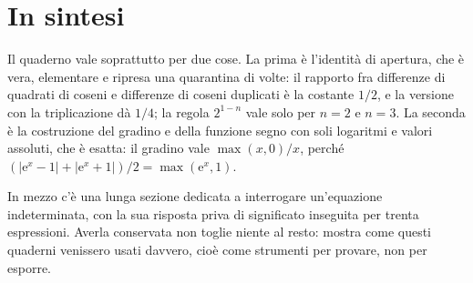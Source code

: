 \section*{In sintesi}

Il quaderno vale soprattutto per due cose. La prima è l'identità di apertura, che è vera, elementare e ripresa una quarantina di volte: il rapporto fra differenze di quadrati di coseni e differenze di coseni duplicati è la costante $1/2$, e la versione con la triplicazione dà $1/4$; la regola $2^{1-n}$ vale solo per $n=2$ e $n=3$. La seconda è la costruzione del gradino e della funzione segno con soli logaritmi e valori assoluti, che è esatta: il gradino vale $\max(x,0)/x$, perché $\left(|\mathrm{e}^x-1|+|\mathrm{e}^x+1|\right)/2=\max(\mathrm{e}^x,1)$.

In mezzo c'è una lunga sezione dedicata a interrogare un'equazione indeterminata, con la sua risposta priva di significato inseguita per trenta espressioni. Averla conservata non toglie niente al resto: mostra come questi quaderni venissero usati davvero, cioè come strumenti per provare, non per esporre.


